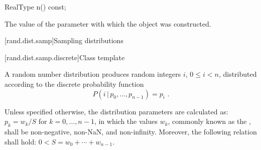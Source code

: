 %
\begin{itemdecl}
RealType n() const;
\end{itemdecl}

\begin{itemdescr}
\pnum
\returns
The value of the  parameter
 with which the object was constructed.
\end{itemdescr}%
%



[rand.dist.samp]{Sampling distributions}%
%



[rand.dist.samp.discrete]{Class template }%
%
%

\pnum
A  random number distribution
produces random integers $i$, $0 \leq i < n$,
distributed according to
the discrete probability function%
%
%
\[  P(i \,|\, p_0, \dotsc, p_{n-1}) = p_i \text{ .} \]

\pnum
Unless specified otherwise,
the distribution parameters are calculated as:
$p_k = {w_k / S}$ for $k = 0, \dotsc, n - 1$,
in which the values $w_k$,
commonly known as the %
%
%
, shall be non-negative, non-NaN, and non-infinity.
Moreover, the following relation shall hold:
$0 < S = w_0 + \dotsb + w_{n - 1}$.


